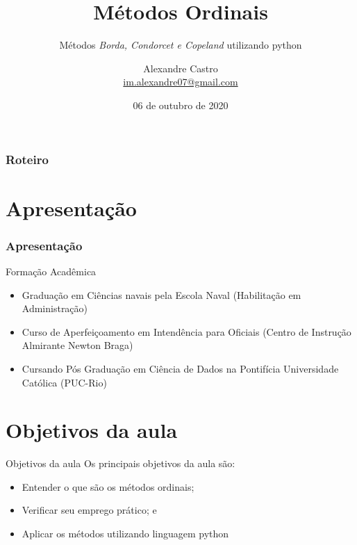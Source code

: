 \documentclass[aspectratio=169]{beamer}
\title[Métodos Ordinais]{Métodos Ordinais}
\subtitle{Métodos \textit{Borda, Condorcet e Copeland} utilizando python}
\begin{document}
\author[M. Alexandre P. C. Junior]{
    \begin{tabular}{c} 
        \Large
        Alexandre Castro\\
        \footnotesize \href{mailto:im.alexandre07@gmail.com}{im.alexandre07@gmail.com}
    \end{tabular}}


\date{06 de outubro de 2020}


\begin{frame}\maketitle\end{frame}


\begin{frame}
    \frametitle{Roteiro}
    \tableofcontents[pausesections]
\end{frame}

\section{Apresentação}
\begin{frame}
    \frametitle{Apresentação}
    Formação Acadêmica
    \begin{itemize}
        \item Graduação em Ciências navais pela Escola Naval (Habilitação em Administração)
        \item Curso de Aperfeiçoamento em Intendência para Oficiais (Centro de Instrução Almirante Newton Braga)
        \item Cursando Pós Graduação em Ciência de Dados na Pontifícia Universidade Católica (PUC-Rio)
    \end{itemize}

\end{frame}

\section{Objetivos da aula}
\begin{frame}{Objetivos da aula}
    Os principais objetivos da aula são:
    \begin{itemize}[<+- | uncover@+>]
        \item Entender o que são os métodos ordinais;
        \item Verificar seu emprego prático; e
        \item \alert{Aplicar os métodos utilizando linguagem python}
    \end{itemize}
\end{frame}
\end{document}
